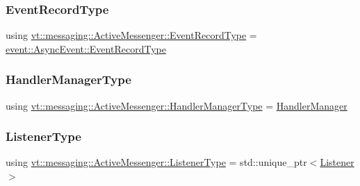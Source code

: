 \mbox{\label{structvt_1_1messaging_1_1_active_messenger_aed736a2b2eaa0f96971a4f0be3fe0a25}} 
\subsubsection{\texorpdfstring{Event\+Record\+Type}{EventRecordType}}
{\footnotesize\ttfamily using \hyperlink{structvt_1_1messaging_1_1_active_messenger_aed736a2b2eaa0f96971a4f0be3fe0a25}{vt\+::messaging\+::\+Active\+Messenger\+::\+Event\+Record\+Type} =  \hyperlink{structvt_1_1event_1_1_async_event_a5b4ef37db6e5962fdc0e6e0e56e74bc1}{event\+::\+Async\+Event\+::\+Event\+Record\+Type}}

\mbox{\label{structvt_1_1messaging_1_1_active_messenger_ac7e9165df6550ea333f8eb018a5a0e60}} 
\subsubsection{\texorpdfstring{Handler\+Manager\+Type}{HandlerManagerType}}
{\footnotesize\ttfamily using \hyperlink{structvt_1_1messaging_1_1_active_messenger_ac7e9165df6550ea333f8eb018a5a0e60}{vt\+::messaging\+::\+Active\+Messenger\+::\+Handler\+Manager\+Type} =  \hyperlink{structvt_1_1_handler_manager}{Handler\+Manager}}

\mbox{\label{structvt_1_1messaging_1_1_active_messenger_a63878fd4ef1fbc505bd1313d32049ca9}} 
\subsubsection{\texorpdfstring{Listener\+Type}{ListenerType}}
{\footnotesize\ttfamily using \hyperlink{structvt_1_1messaging_1_1_active_messenger_a63878fd4ef1fbc505bd1313d32049ca9}{vt\+::messaging\+::\+Active\+Messenger\+::\+Listener\+Type} =  std\+::unique\+\_\+ptr$<$\hyperlink{structvt_1_1messaging_1_1_listener}{Listener}$>$}

